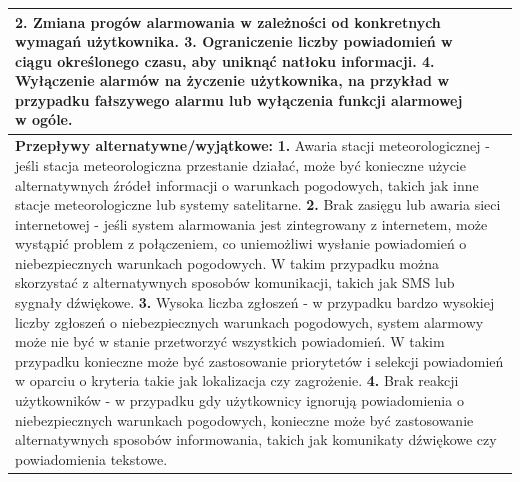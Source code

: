 \documentclass{article}
\begin{document}
\begin{center}
\begin{center}
\begin{tabular}{|l|l|l|}
{        \newline
        \textbf{2.} Zmiana progów alarmowania w zależności od konkretnych wymagań użytkownika.
        \newline
        \textbf{3.} Ograniczenie liczby powiadomień w ciągu określonego czasu, aby uniknąć natłoku informacji.
        \newline
        \textbf{4.} Wyłączenie alarmów na życzenie użytkownika, na przykład w przypadku fałszywego alarmu lub wyłączenia funkcji alarmowej w ogóle.} \\
        \hline
        \hline
        \multicolumn{3}{|p{\dimexpr\linewidth-2\tabcolsep-2\arrayrulewidth}|}{\textbf{Przepływy alternatywne/wyjątkowe:}
        \newline
        \textbf{1.} Awaria stacji meteorologicznej - jeśli stacja meteorologiczna przestanie działać, może być konieczne użycie alternatywnych źródeł informacji o warunkach pogodowych, takich jak inne stacje meteorologiczne lub systemy satelitarne.
        \newline
        \textbf{2.} Brak zasięgu lub awaria sieci internetowej - jeśli system alarmowania jest zintegrowany z internetem, może wystąpić problem z połączeniem, co uniemożliwi wysłanie powiadomień o niebezpiecznych warunkach pogodowych. W takim przypadku można skorzystać z alternatywnych sposobów komunikacji, takich jak SMS lub sygnały dźwiękowe.
        \newline
        \textbf{3.} Wysoka liczba zgłoszeń - w przypadku bardzo wysokiej liczby zgłoszeń o niebezpiecznych warunkach pogodowych, system alarmowy może nie być w stanie przetworzyć wszystkich powiadomień. W takim przypadku konieczne może być zastosowanie priorytetów i selekcji powiadomień w oparciu o kryteria takie jak lokalizacja czy zagrożenie.
        \newline
        \textbf{4.} Brak reakcji użytkowników - w przypadku gdy użytkownicy ignorują powiadomienia o niebezpiecznych warunkach pogodowych, konieczne może być zastosowanie alternatywnych sposobów informowania, takich jak komunikaty dźwiękowe czy powiadomienia tekstowe.} \\
        \hline
        \end{tabular}
    \end{center}

    \newpage


\end{center}
\end{document}
